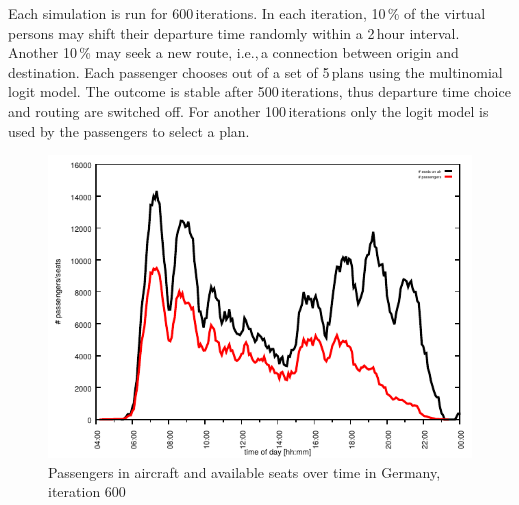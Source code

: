 
Each simulation is run for 600\,iterations.
In each iteration, 10\,\% of the virtual persons may shift their departure time randomly within a 2\,hour interval.
Another 10\,\% may seek a new route, i.e.,\,a connection between origin and destination. 
Each passenger chooses out of a set of 5\,plans using the multinomial logit model. %
The outcome is stable after 500\,iterations, thus departure time choice and routing are switched off. 
For another 100\,iterations only the logit model is used by the passengers to select a plan. 

\begin{figure}[t]
	\centering
	\includegraphics[width=0.9\linewidth]{./extending/figures/air/in_vehicle_histogram_flight_1876_it_600.pdf}
	\caption{Passengers in aircraft and available seats over time in Germany, iteration 600}
	\label{fig:2009_passengers_seats}
\end{figure}

